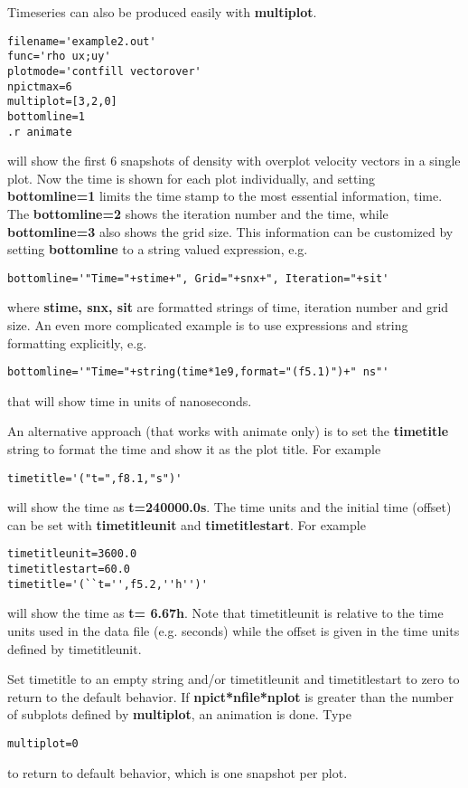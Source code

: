    Timeseries can also be produced easily with {\bf multiplot}. 
\begin{verbatim}
filename='example2.out'
func='rho ux;uy'
plotmode='contfill vectorover'
npictmax=6
multiplot=[3,2,0]
bottomline=1
.r animate
\end{verbatim}
   will show the first 6 snapshots of density with overplot velocity vectors
   in a single plot. 
   Now the time is shown for each plot individually, and setting
   {\bf bottomline=1} limits the time stamp to the most essential
   information, time. The {\bf bottomline=2} shows the iteration number
   and the time, while {\bf bottomline=3} also shows the grid size.
   This information can be customized by setting {\bf bottomline} to
   a string valued expression, e.g.
\begin{verbatim}
bottomline='"Time="+stime+", Grid="+snx+", Iteration="+sit'
\end{verbatim}
where {\bf stime, snx, sit} are formatted strings of time, iteration number
and grid size. An even more complicated example is to use expressions and
string formatting explicitly, e.g.
\begin{verbatim}
bottomline='"Time="+string(time*1e9,format="(f5.1)")+" ns"'
\end{verbatim}
that will show time in units of nanoseconds.

An alternative approach (that works with animate only) is to set the 
{\bf timetitle} string to format the time and show it as the plot title.
For example
\begin{verbatim}
timetitle='("t=",f8.1,"s")'
\end{verbatim}
will show the time as {\bf t=240000.0s}. The time units and the
initial time (offset) can be set with {\bf timetitleunit} 
and {\bf timetitlestart}. For example
\begin{verbatim}
timetitleunit=3600.0
timetitlestart=60.0
timetitle='(``t='',f5.2,''h'')'
\end{verbatim}
   will show the time as {\bf t= 6.67h}. Note that timetitleunit is
   relative to the time units used in the data file (e.g. seconds)
   while the offset is given in the time units defined by timetitleunit.

   Set timetitle to an empty string and/or timetitleunit and timetitlestart
   to zero to return to the default behavior. 
   If {\bf npict*nfile*nplot} is greater than the number 
   of subplots defined by {\bf multiplot}, an animation is done. 
   Type 
\begin{verbatim}
multiplot=0
\end{verbatim}
   to return to default behavior, which is one snapshot per plot.


